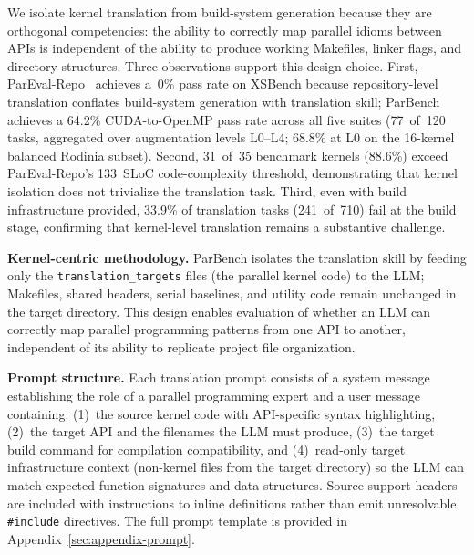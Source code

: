 \documentclass[conference]{IEEEtran}
\begin{document}
We isolate kernel translation from build-system generation because they are orthogonal competencies: the ability to correctly map parallel idioms between APIs is independent of the ability to produce working Makefiles, linker flags, and directory structures. Three observations support this design choice. First, ParEval-Repo~\cite{ParEvalRepo2025} achieves a~0\% pass rate on XSBench because repository-level translation conflates build-system generation with translation skill; ParBench achieves a 64.2\% CUDA-to-OpenMP pass rate across all five suites (77~of~120 tasks, aggregated over augmentation levels L0--L4; 68.8\% at L0 on the 16-kernel balanced Rodinia subset). Second, 31~of~35 benchmark kernels (88.6\%) exceed ParEval-Repo's 133~SLoC code-complexity threshold, demonstrating that kernel isolation does not trivialize the translation task. Third, even with build infrastructure provided, 33.9\% of translation tasks (241~of~710) fail at the build stage, confirming that kernel-level translation remains a substantive challenge.

\textbf{Kernel-centric methodology.} ParBench isolates the translation skill by feeding only the \texttt{translation\_targets} files (the parallel kernel code) to the LLM; Makefiles, shared headers, serial baselines, and utility code remain unchanged in the target directory. This design enables evaluation of whether an LLM can correctly map parallel programming patterns from one API to another, independent of its ability to replicate project file organization.

\textbf{Prompt structure.} Each translation prompt consists of a system message establishing the role of a parallel programming expert and a user message containing: (1)~the source kernel code with API-specific syntax highlighting, (2)~the target API and the filenames the LLM must produce, (3)~the target build command for compilation compatibility, and (4)~read-only target infrastructure context (non-kernel files from the target directory) so the LLM can match expected function signatures and data structures. Source support headers are included with instructions to inline definitions rather than emit unresolvable \texttt{\#include} directives. The full prompt template is provided in Appendix~\ref{sec:appendix-prompt}.
\end{document}
